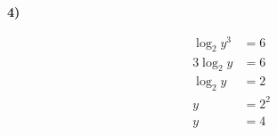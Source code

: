 \documentclass[11pt,a4paper,fleqn]{article}
\begin{document}
\textbf{4)}

\begin{align*}
  \log_{2} y^{3} &= 6 \\
  3 \log_{2} y   &= 6 \\
  \log_{2} y     &= 2 \\
  y              &= 2^{2} \\
  y              &= 4
\end{align*}
\end{document}
